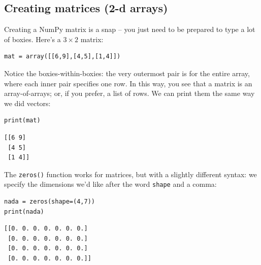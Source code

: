\subsection*{Creating matrices (2-d arrays)}


Creating a NumPy matrix is a snap -- you just need to be prepared to type a lot
of boxies. Here's a $3\times 2$ matrix:

\begin{Verbatim}[fontsize=\small,samepage=true,frame=single,framesep=3mm]
mat = array([[6,9],[4,5],[1,4]])
\end{Verbatim}
\vspace{-.2in}

Notice the boxies-within-boxies: the very outermost pair is for the entire
array, where each inner pair specifies one row. In this way, you see that a
matrix is an array-of-arrays; or, if you prefer, a list of rows. We can print
them the same way we did vectors:

\begin{Verbatim}[fontsize=\small,samepage=true,frame=single,framesep=3mm]
print(mat)
\end{Verbatim}
\vspace{-.2in}

\begin{Verbatim}[fontsize=\small,samepage=true,frame=leftline,framesep=5mm,framerule=1mm]
[[6 9]
 [4 5]
 [1 4]]
\end{Verbatim}

\medskip
{}

The \texttt{zeros()} function works for matrices, but with a slightly different
syntax: we specify the dimensions we'd like after the word \texttt{shape} and a
comma:

\begin{Verbatim}[fontsize=\small,samepage=true,frame=single,framesep=3mm]
nada = zeros(shape=(4,7))
print(nada)
\end{Verbatim}
\vspace{-.2in}

\begin{Verbatim}[fontsize=\small,samepage=true,frame=leftline,framesep=5mm,framerule=1mm]
[[0. 0. 0. 0. 0. 0. 0.]
 [0. 0. 0. 0. 0. 0. 0.]
 [0. 0. 0. 0. 0. 0. 0.]
 [0. 0. 0. 0. 0. 0. 0.]]
\end{Verbatim}

\medskip
{}

